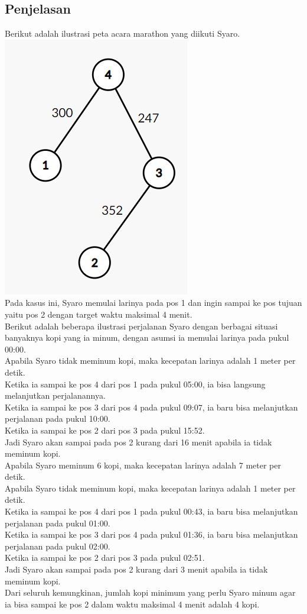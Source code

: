 \documentclass{article}
\begin{document}
\subsection*{Penjelasan}
Berikut adalah ilustrasi peta acara marathon yang diikuti Syaro.\\
\includegraphics[scale=0.6]{graph}\\
Pada kasus ini, Syaro memulai larinya pada pos 1 dan ingin sampai ke pos tujuan yaitu pos 2 dengan target waktu maksimal 4 menit.\\

Berikut adalah beberapa ilustrasi perjalanan Syaro dengan berbagai situasi banyaknya kopi yang ia minum, dengan asumsi ia memulai larinya pada pukul 00:00.\\
Apabila Syaro tidak meminum kopi, maka kecepatan larinya adalah 1 meter per detik.\\
Ketika ia sampai ke pos 4 dari pos 1 pada pukul 05:00, ia bisa langsung melanjutkan perjalanannya.\\
Ketika ia sampai ke pos 3 dari pos 4 pada pukul 09:07, ia baru bisa melanjutkan perjalanan pada pukul 10:00.\\
Ketika ia sampai ke pos 2 dari pos 3 pada pukul 15:52.\\
Jadi Syaro akan sampai pada pos 2 kurang dari 16 menit apabila ia tidak meminum kopi.\\

Apabila Syaro meminum 6 kopi, maka kecepatan larinya adalah 7 meter per detik.\\
Apabila Syaro tidak meminum kopi, maka kecepatan larinya adalah 1 meter per detik.\\
Ketika ia sampai ke pos 4 dari pos 1 pada pukul 00:43, ia baru bisa melanjutkan perjalanan pada pukul 01:00.\\
Ketika ia sampai ke pos 3 dari pos 4 pada pukul 01:36, ia baru bisa melanjutkan perjalanan pada pukul 02:00.\\
Ketika ia sampai ke pos 2 dari pos 3 pada pukul 02:51.\\
Jadi Syaro akan sampai pada pos 2 kurang dari 3 menit apabila ia tidak meminum kopi.\\

Dari seluruh kemungkinan, jumlah kopi minimum yang perlu Syaro minum agar ia bisa sampai ke pos 2 dalam waktu maksimal 4 menit adalah 4 kopi.
\end{document}
